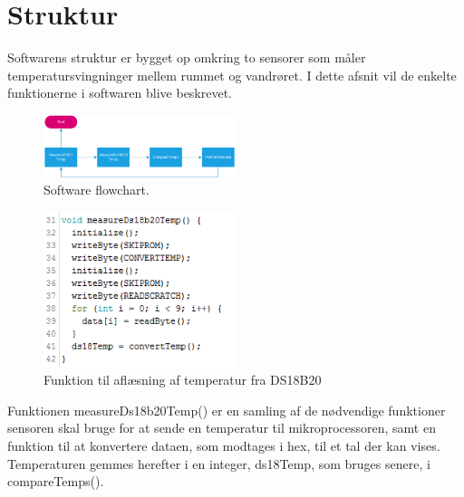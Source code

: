 \section{Struktur}
Softwarens struktur er bygget op omkring to sensorer som måler temperatursvingninger mellem rummet og vandrøret. I dette afsnit vil de enkelte funktionerne i softwaren blive beskrevet. 
\begin{figure}[h!]
  \centering
  \includegraphics[width=0.5\textwidth]{figures/Fase1software2.png}
  \caption{Software flowchart.}
  \label{fase1flow}
\end{figure}


\begin{figure}[h!]
  \centering
  \includegraphics[width=0.5\textwidth]{figures/kode_measure_ds18b20.png}
  \caption{Funktion til aflæsning af temperatur fra DS18B20}
  \label{ds18b20Measure}
\end{figure}
Funktionen measureDs18b20Temp() er en samling af de nødvendige funktioner sensoren skal bruge for at sende en temperatur til mikroprocessoren, samt en funktion til at konvertere dataen, som modtages i hex, til et tal der kan vises.\newline
Temperaturen gemmes herefter i en integer, ds18Temp, som bruges senere, i compareTemps().\\\\

